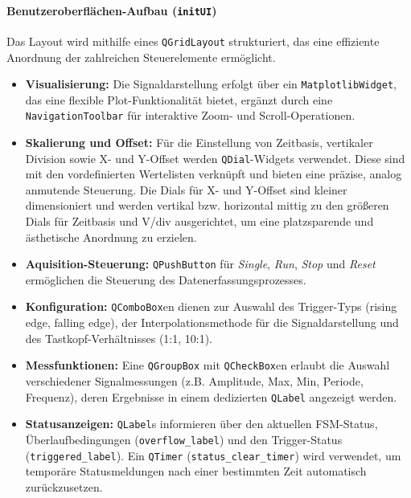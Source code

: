 \documentclass[a4paper, portrait, 12pt]{scrartcl} %
\begin{document}
\paragraph{Benutzeroberflächen-Aufbau (\texttt{initUI})}
Das Layout wird mithilfe eines \texttt{QGridLayout} strukturiert, das eine effiziente Anordnung der zahlreichen Steuerelemente ermöglicht.
\begin{itemize}
    \item \textbf{Visualisierung:} Die Signaldarstellung erfolgt über ein \texttt{MatplotlibWidget}, das eine flexible Plot-Funktionalität bietet, ergänzt durch eine \texttt{NavigationToolbar} für interaktive Zoom- und Scroll-Operationen.
    \item \textbf{Skalierung und Offset:} Für die Einstellung von Zeitbasis, vertikaler Division sowie X- und Y-Offset werden \texttt{QDial}-Widgets verwendet. Diese sind mit den vordefinierten Wertelisten verknüpft und bieten eine präzise, analog anmutende Steuerung. Die Dials für X- und Y-Offset sind kleiner dimensioniert und werden vertikal bzw. horizontal mittig zu den größeren Dials für Zeitbasis und V/div ausgerichtet, um eine platzsparende und ästhetische Anordnung zu erzielen.
    \item \textbf{Aquisition-Steuerung:} \texttt{QPushButton} für \emph{Single}, \emph{Run}, \emph{Stop} und \emph{Reset} ermöglichen die Steuerung des Datenerfassungsprozesses.
    \item \textbf{Konfiguration:} \texttt{QComboBox}en dienen zur Auswahl des Trigger-Typs (rising edge, falling edge), der Interpolationsmethode für die Signaldarstellung und des Tastkopf-Verhältnisses (1:1, 10:1).
    \item \textbf{Messfunktionen:} Eine \texttt{QGroupBox} mit \texttt{QCheckBox}en erlaubt die Auswahl verschiedener Signalmessungen (z.B. Amplitude, Max, Min, Periode, Frequenz), deren Ergebnisse in einem dedizierten \texttt{QLabel} angezeigt werden.
    \item \textbf{Statusanzeigen:} \texttt{QLabel}s informieren über den aktuellen FSM-Status, Überlaufbedingungen (\texttt{overflow\_label}) und den Trigger-Status (\texttt{triggered\_label}). Ein \texttt{QTimer} (\texttt{status\_clear\_timer}) wird verwendet, um temporäre Statusmeldungen nach einer bestimmten Zeit automatisch zurückzusetzen.
\end{itemize}
\end{document}
